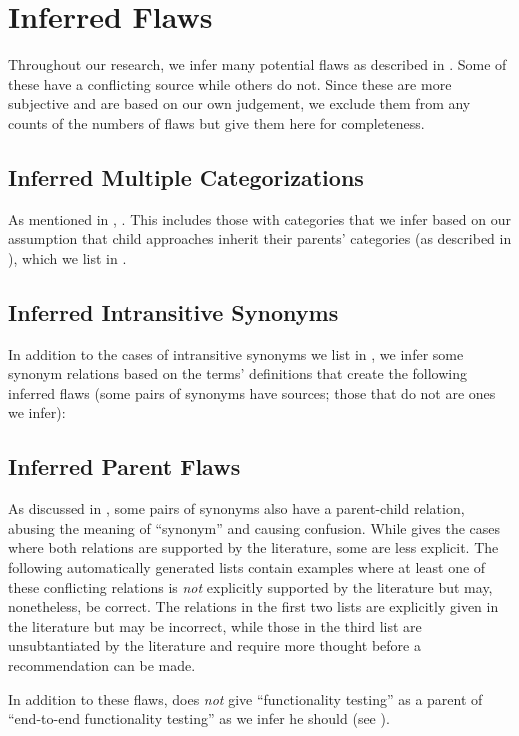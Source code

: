 \section{Inferred Flaws}\label{infer-flaws}
Throughout our research, we infer many potential flaws as described in
. Some of these have a conflicting source while others do not.
Since these are more subjective and are based on our own judgement, we
exclude them from any counts of the numbers of flaws but give them here for
completeness.

\subsection{Inferred Multiple Categorizations}\label{infMultiCats}
As mentioned in , \multiCatIntro{}. This includes those with
categories that we infer based on our assumption that child approaches
inherit their parents' categories (as described in ), which we
list in .



\newpage

\subsection{Inferred Intransitive Synonyms}\label{infMultiSyns}
In addition to the \multiSynCount{} cases of intransitive synonyms we list in
, we infer some synonym relations based on the terms'
definitions that create the following inferred flaws (some pairs of synonyms
have sources; those that do not are ones we infer):

\begin{enumerate}
    
\end{enumerate}

\subsection{Inferred Parent Flaws}\label{infParSyns}
As discussed in , some pairs of synonyms also have a
parent-child relation, abusing the meaning of ``synonym'' and causing
confusion. While  gives the cases where both relations
are supported by the literature, some are less explicit. The
following automatically generated lists contain examples where at least
one of these conflicting relations is \emph{not} explicitly supported by the
literature but may, nonetheless, be correct. The relations in the first two
lists are explicitly given in the literature but may be incorrect, while
those in the third list are unsubtantiated by the literature and require
more thought before a recommendation can be made.



In addition to these flaws, \citep[Tab.~2]{Gerrard2000a} does
\emph{not} give ``functionality testing'' as a parent of ``end-to-end
functionality testing'' as we infer he should (see ).
